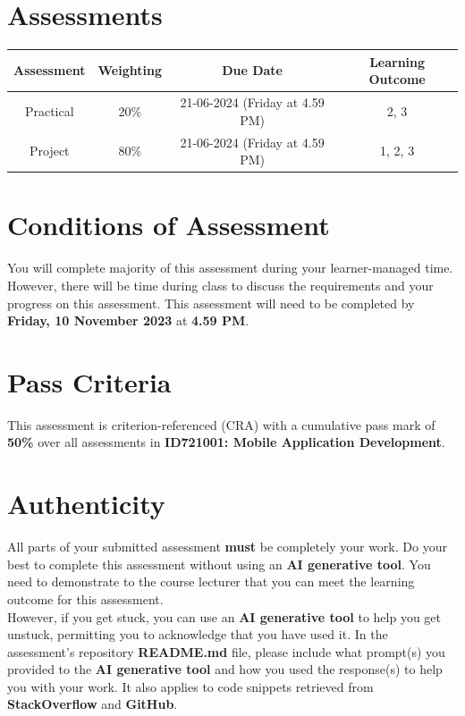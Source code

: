 \documentclass{article}
\begin{document}
\section*{Assessments}
\renewcommand{\arraystretch}{1.5}
\begin{tabular}{|c|c|c|c|}
	\hline
	\textbf{Assessment}                                 & \textbf{Weighting} & \textbf{Due Date}            & \textbf{Learning Outcome} \\ \hline
	\small Practical & \small 20\%        & \small 21-06-2024 (Friday at 4.59 PM)   & \small 2, 3                   \\ \hline
	\small Project                 & \small 80\%        & \small 21-06-2024 (Friday at 4.59 PM) \small  & \small 1, 2, 3                   \\ \hline
\end{tabular}

\section*{Conditions of Assessment}
You will complete majority of this assessment during your learner-managed time. However, there will be time during class to discuss the requirements and your progress on this assessment. This assessment will need to be completed by \textbf{Friday, 10 November 2023} at \textbf{4.59 PM}.

\section*{Pass Criteria}
This assessment is criterion-referenced (CRA) with a cumulative pass mark of \textbf{50\%} over all assessments in \textbf{ID721001: Mobile Application Development}.

\section*{Authenticity}
All parts of your submitted assessment \textbf{must} be completely your work. Do your best to complete this assessment without using an \textbf{AI generative tool}. You need to demonstrate to the course lecturer that you can meet the learning outcome for this assessment. \\
 
 However, if you get stuck, you can use an \textbf{AI generative tool} to help you get unstuck, permitting you to acknowledge that you have used it. In the assessment's repository \textbf{README.md} file, please include what prompt(s) you provided to the \textbf{AI generative tool} and how you used the response(s) to help you with your work. It also applies to code snippets retrieved from \textbf{StackOverflow} and \textbf{GitHub}. \\
 
\end{document}
